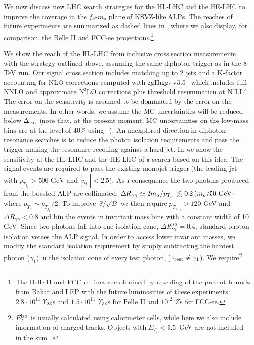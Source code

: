 We now discuss new LHC search strategies
for the HL-LHC and the HE-LHC to improve the coverage in the $f_a$-$m_a$ plane of KSVZ-like ALPs.
%
The reaches of future experiments are summarized as dashed lines in ,
where we also display, for comparison, the Belle II and FCC-ee projections.\footnote{The Belle II and FCC-ee lines are obtained by rescaling of the present bounds from Babar and LEP with the future luminosities of these experiments: $2.8\cdot 10^{11}$ $\Upsilon_{2S}$s and $1.5\cdot 10^{11}$  $\Upsilon_{3S}$s for Belle II and $10^{12}$ $Z$s for FCC-ee.}

We show the reach of the HL-LHC from
inclusive cross section measurements
with the strategy outlined above,
assuming the same diphoton trigger as in the 8 TeV run. Our signal cross section includes matching up to 2 jets and a K-factor accounting for NLO corrections computed with ggHiggs v3.5~\cite{Ball:2013bra,Bonvini:2014jma,Bonvini:2016frm,Ahmed:2016otz} which includes full NNLO and approximate $\text{N}^3\text{LO}$ corrections plus threshold resummation at $\text{N}^3\text{LL}'$. The error on the sensitivity is assumed to be dominated by the error on the measurements.
In other words, we assume the MC uncertainties will be reduced below $\Delta_{\rm tot}$ (note that, at the present moment, MC uncertainties on the low-mass bins are at the level of 40\% using \sherpa~\cite{Aaboud:2017vol, Gleisberg:2008ta,Catani:2018krb}).
An unexplored direction in diphoton resonance searches is to reduce the photon isolation requirements and pass the trigger making the resonance recoiling against a hard jet.  In  we show the sensitivity at the HL-LHC and the HE-LHC of a search based on this idea.
The signal events are required to pass the existing monojet trigger (the leading jet with $p_{T_{j_1}}>500\text{ GeV}$ and $|\eta_{j_1}|<2.5$). As a consequence the two photons produced from the boosted ALP are collimated: $\Delta R_{\gamma\gamma}\simeq 2 m_a /p_{T_{j_1}} \lesssim 0.2\left(m_a/{\rm 50~GeV}\right)$ where $p_{T_{\gamma}}\sim p_{T_{j_1}}/2$. To improve $S/\sqrt{B}$ we then require $p_{T_{\gamma_{1,2}}}>120\text{ GeV}$ and $\Delta R_{\gamma\gamma}<0.8$ and bin the events in invariant mass bins with a constant width of 10 GeV. Since two photons fall into one isolation cone, $\Delta R_{\gamma\gamma}^{\text{iso}}=0.4$, standard photon isolation vetoes the ALP signal. In order to access lower invariant masses, we modify the standard isolation requirement by simply subtracting the hardest photon ($\gamma_1$) in the isolation cone of every test photon,  ($\gamma_{\rm test}\neq \gamma_1$). We require\footnote{$E_{T}^{\rm iso}$ is usually calculated using calorimeter cells, while here we also include information of charged tracks. Objects with $E_{T_i}<0.5$~GeV are not included in the sum~\cite{deFavereau:2013fsa}.}
